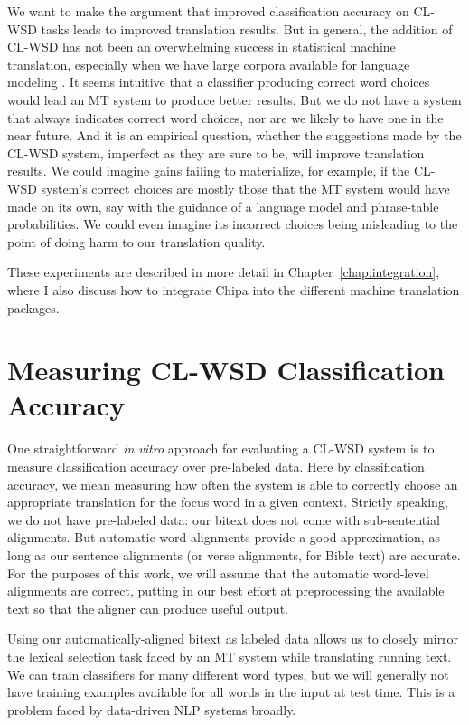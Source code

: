 We want to make the argument that improved classification accuracy on CL-WSD
tasks leads to improved translation results.
But in general, the addition of CL-WSD has not been an overwhelming success in
statistical machine translation, especially when we have large corpora
available for language modeling \cite{carpuatpsd}.
It seems intuitive that a
classifier producing correct word choices would lead an MT system to produce
better results. But we do not have a system that always indicates correct word
choices, nor are we likely to have one in the near future. And it is an
empirical question, whether the suggestions made by the CL-WSD system,
imperfect as they are sure to be, will improve translation results. We could
imagine gains failing to materialize, for example, if the CL-WSD system's
correct choices are mostly those that the MT system would have made on its own,
say with the guidance of a language model and phrase-table probabilities. 
We could even imagine its incorrect choices being misleading to the point of
doing harm to our translation quality.

These experiments are described in more detail in
Chapter~\ref{chap:integration}, where I also discuss how to integrate Chipa
into the different machine translation packages.

\section{Measuring CL-WSD Classification Accuracy}
One straightforward \emph{in vitro} approach for evaluating a CL-WSD system is
to measure classification accuracy over pre-labeled data. Here by
classification accuracy, we mean measuring how often the system is able to
correctly choose an appropriate translation for the focus word in a given
context.
Strictly speaking, we
do not have pre-labeled data: our bitext does not come with sub-sentential
alignments. But automatic word alignments provide a good approximation, as long
as our sentence alignments (or verse alignments, for Bible text) are accurate.
For the purposes of this work, we will assume that the automatic word-level
alignments are correct, putting in our best effort at preprocessing the
available text so that the aligner can produce useful output.

Using our automatically-aligned bitext as labeled data allows us to closely
mirror the lexical selection task faced by an MT system while translating
running text. We can train classifiers for many different word types, but we
will generally not have training examples available for all words in the input
at test time. This is a problem faced by data-driven NLP systems broadly.

